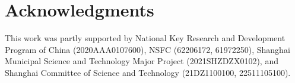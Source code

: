 \documentclass{article}
\begin{document}
\section*{Acknowledgments}
This work was partly supported by National Key Research and Development Program of China (2020AAA0107600), NSFC (62206172, 61972250), Shanghai Municipal Science and Technology Major Project (2021SHZDZX0102), and Shanghai Committee of Science and Technology (21DZ1100100, 22511105100).


{
\small

}
































\appendix
\end{document}
